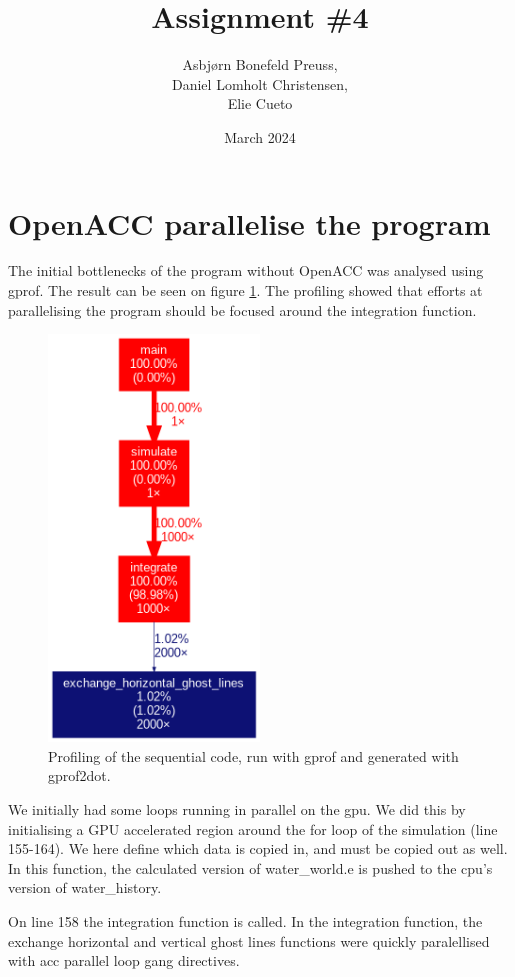 \documentclass{article}
\title{Assignment \#4}
\author{Asbjørn Bonefeld Preuss,\\ Daniel Lomholt Christensen,\\ Elie Cueto}
\date{March 2024}
\begin{document}
\maketitle
\section{OpenACC parallelise the program}
The initial bottlenecks of the program without OpenACC was analysed using gprof. The result can be seen on figure \ref{fig:profiling:seq}. The profiling showed that efforts at parallelising the program should be focused around the integration function.
\begin{figure}[h]
    \includegraphics[width=0.5\textwidth]{./figures/sequential_profile.png}
    \centering
    \caption{Profiling of the sequential code, run with gprof and generated with gprof2dot.}
    \label{fig:profiling:seq}
\end{figure}
We initially had some loops running in parallel on the gpu. 
We did this by initialising a GPU accelerated region around the for loop of the simulation (line 155-164).
We here define which data is copied in, and must be copied out as well. In this function, the calculated version of water\_world.e is pushed to the cpu's version of water\_history.

On line 158 the integration function is called. In the integration function, the exchange horizontal and vertical ghost lines functions were quickly paralellised with acc parallel loop gang directives.
\end{document}
